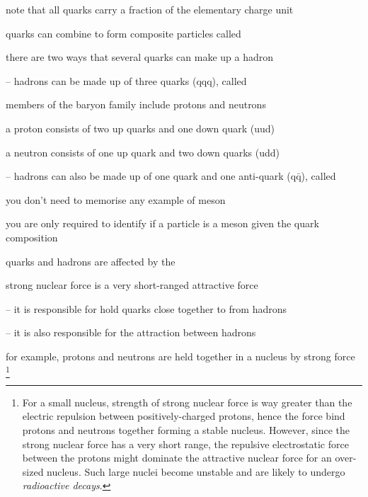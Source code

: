 note that all quarks carry a fraction of the elementary charge unit

\cmt quarks can combine to form composite particles called 

there are two ways that several quarks can make up a hadron

\begin{compactenum}
	\item[--] hadrons can be made up of three quarks (qqq), called 
	
	members of the baryon family include protons and neutrons
	
	a proton consists of two up quarks and one down quark (uud)
	
	a neutron consists of one up quark and two down quarks (udd)
	
	\item[--] hadrons can also be made up of one quark and one anti-quark (q$\bar{\text{q}}$), called 
	
	you don't need to memorise any example of meson
	
	you are only required to identify if a particle is a meson given the quark composition
\end{compactenum}

\cmt quarks and hadrons are affected by the 

strong nuclear force is a very short-ranged attractive force

\begin{compactenum}
	\item[--] it is responsible for hold quarks close together to from hadrons

	\item[--] it is also responsible for the attraction between hadrons
	
	for example, protons and neutrons are held together in a nucleus by strong force
	\footnote{For a small nucleus, strength of strong nuclear force is way greater than the electric repulsion between positively-charged protons, hence the force bind protons and neutrons together forming a stable nucleus. However, since the strong nuclear force has a very short range, the repulsive electrostatic force between the protons might dominate the attractive nuclear force for an over-sized nucleus. Such large nuclei become unstable and are likely to undergo \emph{radioactive decays}.}
\end{compactenum}



